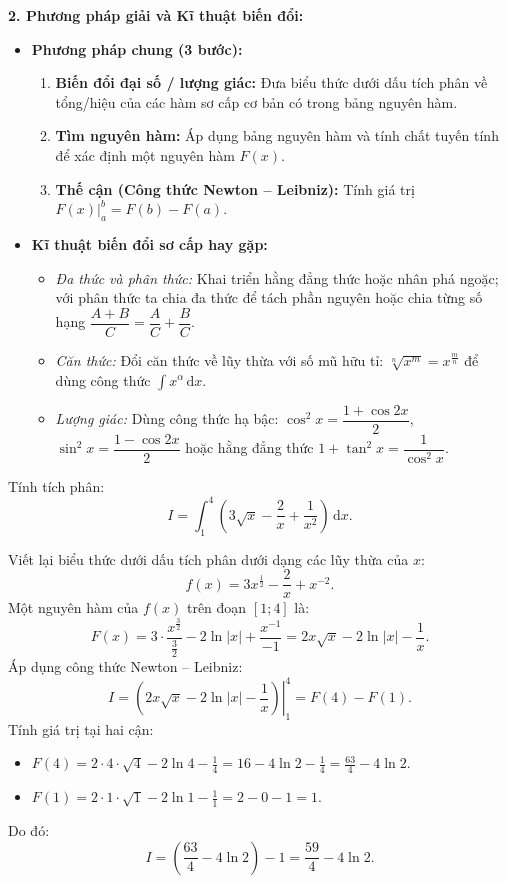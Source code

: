 \documentclass[12pt]{article}
\begin{document}
	\noindent \textbf{2. Phương pháp giải và Kĩ thuật biến đổi:}
	\begin{itemize}
		\item \textbf{Phương pháp chung (3 bước):}
		\begin{enumerate}[label=Bước \arabic*:]
			\item \textbf{Biến đổi đại số / lượng giác:} Đưa biểu thức dưới dấu tích phân về tổng/hiệu của các hàm sơ cấp cơ bản có trong bảng nguyên hàm.
			\item \textbf{Tìm nguyên hàm:} Áp dụng bảng nguyên hàm và tính chất tuyến tính để xác định một nguyên hàm $F(x)$.
			\item \textbf{Thế cận (Công thức Newton -- Leibniz):} Tính giá trị $\left. F(x) \right|_a^b = F(b) - F(a)$.
		\end{enumerate}
		\item \textbf{Kĩ thuật biến đổi sơ cấp hay gặp:}
		\begin{itemize}
			\item \textit{Đa thức và phân thức:} Khai triển hằng đẳng thức hoặc nhân phá ngoặc; với phân thức ta chia đa thức để tách phần nguyên hoặc chia từng số hạng $\dfrac{A + B}{C} = \dfrac{A}{C} + \dfrac{B}{C}$.
			\item \textit{Căn thức:} Đổi căn thức về lũy thừa với số mũ hữu tỉ: $\sqrt[n]{x^m} = x^{\frac{m}{n}}$ để dùng công thức $\displaystyle \int x^\alpha\,\mathrm{d}x$.
			\item \textit{Lượng giác:} Dùng công thức hạ bậc: $\cos^2 x = \dfrac{1 + \cos 2x}{2}$, $\sin^2 x = \dfrac{1 - \cos 2x}{2}$ hoặc hằng đẳng thức $1 + \tan^2 x = \dfrac{1}{\cos^2 x}$.
		\end{itemize}
	\end{itemize}
	
	\begin{vidu}
		Tính tích phân:
		\[
		I = \int_1^4 \left( 3\sqrt{x} - \frac{2}{x} + \frac{1}{x^2} \right)\,\mathrm{d}x.
		\]
	\end{vidu}
	\begin{loigiai}
		Viết lại biểu thức dưới dấu tích phân dưới dạng các lũy thừa của $x$:
		\[
		f(x) = 3x^{\frac{1}{2}} - \frac{2}{x} + x^{-2}.
		\]
		Một nguyên hàm của $f(x)$ trên đoạn $[1; 4]$ là:
		\[
		F(x) = 3 \cdot \frac{x^{\frac{3}{2}}}{\frac{3}{2}} - 2\ln|x| + \frac{x^{-1}}{-1} = 2x\sqrt{x} - 2\ln|x| - \frac{1}{x}.
		\]
		Áp dụng công thức Newton -- Leibniz:
		\[
		I = \left. \left( 2x\sqrt{x} - 2\ln|x| - \frac{1}{x} \right) \right|_1^4 = F(4) - F(1).
		\]
		Tính giá trị tại hai cận:
		\begin{itemize}
			\item $F(4) = 2 \cdot 4 \cdot \sqrt{4} - 2\ln 4 - \frac{1}{4} = 16 - 4\ln 2 - \frac{1}{4} = \frac{63}{4} - 4\ln 2$.
			\item $F(1) = 2 \cdot 1 \cdot \sqrt{1} - 2\ln 1 - \frac{1}{1} = 2 - 0 - 1 = 1$.
		\end{itemize}
		Do đó:
		\[
		I = \left( \frac{63}{4} - 4\ln 2 \right) - 1 = \frac{59}{4} - 4\ln 2.
		\]
	\end{loigiai}
	
\end{document}

